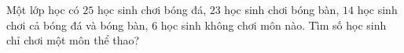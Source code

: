 \begin{ex}
Một lớp học có $25$ học sinh chơi bóng đá, $23$ học sinh chơi bóng bàn, $14$ học sinh chơi cả bóng đá và bóng bàn, $6$ học sinh không chơi môn nào. Tìm số học sinh chỉ chơi một môn thể thao?
\end{ex}

